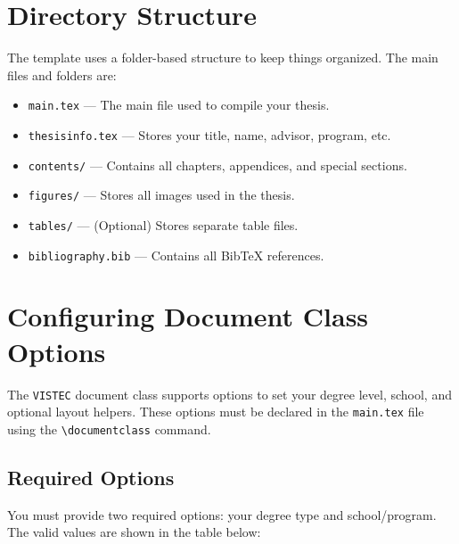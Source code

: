 \documentclass{VISTEC}
\begin{document}
\section{Directory Structure}
\label{manual:directory-structure}

\begin{paragraph}
The template uses a folder-based structure to keep things organized. The main files and folders are:
\end{paragraph}

\begin{itemize}[leftmargin=\paritemindent]
    \item \texttt{main.tex} — The main file used to compile your thesis.
    \item \texttt{thesisinfo.tex} — Stores your title, name, advisor, program, etc.
    \item \texttt{contents/} — Contains all chapters, appendices, and special sections.
    \item \texttt{figures/} — Stores all images used in the thesis.
    \item \texttt{tables/} — (Optional) Stores separate table files.
    \item \texttt{bibliography.bib} — Contains all BibTeX references.
\end{itemize}






\section{Configuring Document Class Options}
\label{manual:class-options}

\begin{paragraph}
The \texttt{VISTEC} document class supports options to set your degree level, school, and optional layout helpers. These options must be declared in the \texttt{main.tex} file using the \verb|\documentclass| command.
\end{paragraph}

\subsection{Required Options}
\label{manual:class-required}

\begin{subparagraph}
You must provide two required options: your degree type and school/program. The valid values are shown in the table below:
\end{subparagraph}
\end{document}
